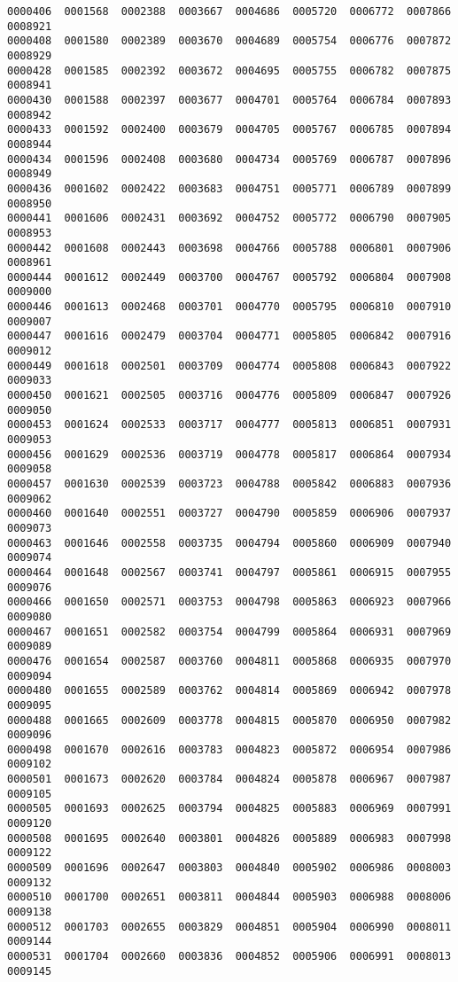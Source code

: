 \documentclass[11pt]{article}
\begin{document}
\begin{Verbatim}[commandchars=\\\{\}]
0000406  0001568  0002388  0003667  0004686  0005720  0006772  0007866	0008921
0000408  0001580  0002389  0003670  0004689  0005754  0006776  0007872	0008929
0000428  0001585  0002392  0003672  0004695  0005755  0006782  0007875	0008941
0000430  0001588  0002397  0003677  0004701  0005764  0006784  0007893	0008942
0000433  0001592  0002400  0003679  0004705  0005767  0006785  0007894	0008944
0000434  0001596  0002408  0003680  0004734  0005769  0006787  0007896	0008949
0000436  0001602  0002422  0003683  0004751  0005771  0006789  0007899	0008950
0000441  0001606  0002431  0003692  0004752  0005772  0006790  0007905	0008953
0000442  0001608  0002443  0003698  0004766  0005788  0006801  0007906	0008961
0000444  0001612  0002449  0003700  0004767  0005792  0006804  0007908	0009000
0000446  0001613  0002468  0003701  0004770  0005795  0006810  0007910	0009007
0000447  0001616  0002479  0003704  0004771  0005805  0006842  0007916	0009012
0000449  0001618  0002501  0003709  0004774  0005808  0006843  0007922	0009033
0000450  0001621  0002505  0003716  0004776  0005809  0006847  0007926	0009050
0000453  0001624  0002533  0003717  0004777  0005813  0006851  0007931	0009053
0000456  0001629  0002536  0003719  0004778  0005817  0006864  0007934	0009058
0000457  0001630  0002539  0003723  0004788  0005842  0006883  0007936	0009062
0000460  0001640  0002551  0003727  0004790  0005859  0006906  0007937	0009073
0000463  0001646  0002558  0003735  0004794  0005860  0006909  0007940	0009074
0000464  0001648  0002567  0003741  0004797  0005861  0006915  0007955	0009076
0000466  0001650  0002571  0003753  0004798  0005863  0006923  0007966	0009080
0000467  0001651  0002582  0003754  0004799  0005864  0006931  0007969	0009089
0000476  0001654  0002587  0003760  0004811  0005868  0006935  0007970	0009094
0000480  0001655  0002589  0003762  0004814  0005869  0006942  0007978	0009095
0000488  0001665  0002609  0003778  0004815  0005870  0006950  0007982	0009096
0000498  0001670  0002616  0003783  0004823  0005872  0006954  0007986	0009102
0000501  0001673  0002620  0003784  0004824  0005878  0006967  0007987	0009105
0000505  0001693  0002625  0003794  0004825  0005883  0006969  0007991	0009120
0000508  0001695  0002640  0003801  0004826  0005889  0006983  0007998	0009122
0000509  0001696  0002647  0003803  0004840  0005902  0006986  0008003	0009132
0000510  0001700  0002651  0003811  0004844  0005903  0006988  0008006	0009138
0000512  0001703  0002655  0003829  0004851  0005904  0006990  0008011	0009144
0000531  0001704  0002660  0003836  0004852  0005906  0006991  0008013	0009145

\end{Verbatim}
\end{document}
